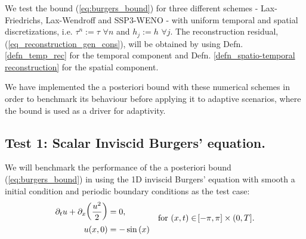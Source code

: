 \documentclass[final]{amsart}
\numberwithin{equation}{section}
\begin{document}
We test the bound (\ref{eq:burgers_bound}) for three different schemes
- Lax-Friedrichs, Lax-Wendroff and SSP3-WENO - with uniform temporal
and spatial discretizations, i.e. $\tau^n:=\tau $ $\forall n$ and
$h_j:=h$ $\forall j$.  The reconstruction residual,
(\ref{eq_reconstruction_gen_cons}), will be obtained by using
Defn. \ref{defn_temp_rec} for the temporal component and
Defn. \ref{defn_spatio-temporal reconstruction} for the spatial
component.


We have implemented the a posteriori bound with these numerical
schemes in order to benchmark its behaviour before applying it to
adaptive scenarios, where the bound is used as a driver for
adaptivity.

\subsection{Test 1: Scalar Inviscid Burgers' equation. }
We will benchmark the performance of the a posteriori bound
(\ref{eq:burgers_bound}) in using the 1D inviscid Burgers' equation
with smooth a initial condition and periodic boundary conditions as
the test case:
\begin{equation}\label{eq_burgers}
\begin{aligned}
\partial_t u +\partial_x\!\left({\frac{u^2}{2}}\right)&=0,\\
u\!\left({x,0}\right)&=-\operatorname{sin}\left(x\right)
\end{aligned}\quad \text{for }\!\left({x,t}\right) \in \!\left[{-\pi,\pi}\right]\times(0,T].
\end{equation}
\end{document}
